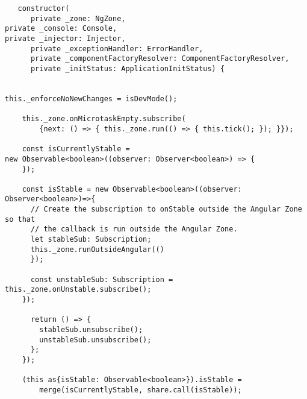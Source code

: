 \begin{verbatim}
   constructor(
      private _zone: NgZone,
private _console: Console,
private _injector: Injector,
      private _exceptionHandler: ErrorHandler,
      private _componentFactoryResolver: ComponentFactoryResolver,
      private _initStatus: ApplicationInitStatus) {


this._enforceNoNewChanges = isDevMode();

    this._zone.onMicrotaskEmpty.subscribe(
        {next: () => { this._zone.run(() => { this.tick(); }); }});

    const isCurrentlyStable =
new Observable<boolean>((observer: Observer<boolean>) => {
    });

    const isStable = new Observable<boolean>((observer: Observer<boolean>)=>{
      // Create the subscription to onStable outside the Angular Zone so that
      // the callback is run outside the Angular Zone.
      let stableSub: Subscription;
      this._zone.runOutsideAngular(()
      });

      const unstableSub: Subscription = this._zone.onUnstable.subscribe();
    });

      return () => {
        stableSub.unsubscribe();
        unstableSub.unsubscribe();
      };
    });

    (this as{isStable: Observable<boolean>}).isStable =
        merge(isCurrentlyStable, share.call(isStable));
\end{verbatim}
